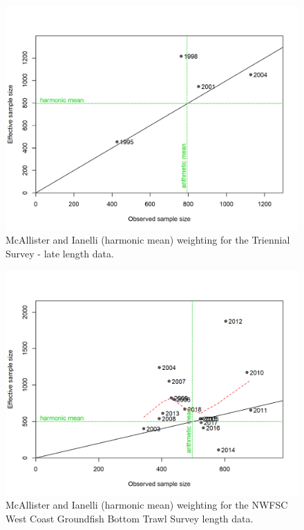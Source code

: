 \documentclass[12pt,]{article}
\begin{document}
\FloatBarrier

\begin{figure}
\centering
\includegraphics{r4ss/plots_mod1/comp_lenfit_sampsize_flt6mkt0.png}
\caption{McAllister and Ianelli (harmonic mean) weighting for the
Triennial Survey - late length data. \label{fig:harm_mean_tri_late}}
\end{figure}

\FloatBarrier

\begin{figure}
\centering
\includegraphics{r4ss/plots_mod1/comp_lenfit_sampsize_flt7mkt0.png}
\caption{McAllister and Ianelli (harmonic mean) weighting for the NWFSC
West Coast Groundfish Bottom Trawl Survey length data.
\label{fig:harm_mean_nwfsc}}
\end{figure}
\end{document}
